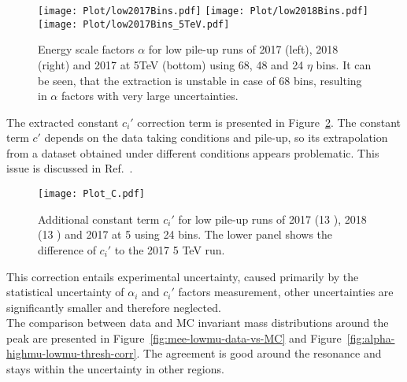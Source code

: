 \begin{table}
	\caption{Values of $\eta_{\text{calo}}$ bin frontiers for energy scale factors for low pile-up runs.}\label{tab:lowmucalibbins}
	\label{tab:CS_BinFrontier}
\end{table}

\begin{figure}[htp]
	\begin{center}
		\texttt{[image: Plot/low2017Bins.pdf]}%
		\texttt{[image: Plot/low2018Bins.pdf]}
		\texttt{[image: Plot/low2017Bins\_5TeV.pdf]}
		\caption{ Energy scale factors $\alpha$ for low pile-up runs of
			2017 (left), 2018 (right) and 2017 at 5TeV (bottom) using 68, 48 and 24 $\eta$ 
			bins. It can be seen, that the extraction is unstable in case of 68 bins,
			resulting in $\alpha$ factors with very large uncertainties.}
		\label{fig:alpha-lowmu-manybinnings}
	\end{center}
\end{figure}

The extracted constant $c_i'$ correction term is presented in
Figure~\ref{fig:C_lowmu}. The constant term $c'$ depends on the data taking conditions and pile-up, so its extrapolation from a dataset obtained under different conditions appears problematic. This issue is discussed in Ref.~\cite{Andari:2651890}.

\begin{figure}[htp]
	\begin{center}
		\texttt{[image: Plot\_C.pdf]}%
		\caption{ Additional constant term $c_i'$ for low pile-up runs of 
			2017 (13 \TeV), 2018 (13 \TeV) and 2017 at 5 \TeV{} using 24 bins.
			The lower panel shows the difference of $c_i'$ to the 2017 5 TeV run.}
		\label{fig:C_lowmu}
	\end{center}
\end{figure}

This correction entails experimental uncertainty, caused primarily by the statistical uncertainty of $\alpha_i$ and $c_i'$ factors measurement, other uncertainties are significantly smaller and therefore neglected.\\
The comparison between data and MC invariant mass distributions around the \Zee peak are presented in Figure~\ref{fig:mee-lowmu-data-vs-MC} and Figure~\ref{fig:alpha-highmu-lowmu-thresh-corr}. The agreement is good around the \Zee resonance and stays within the uncertainty in other regions.

